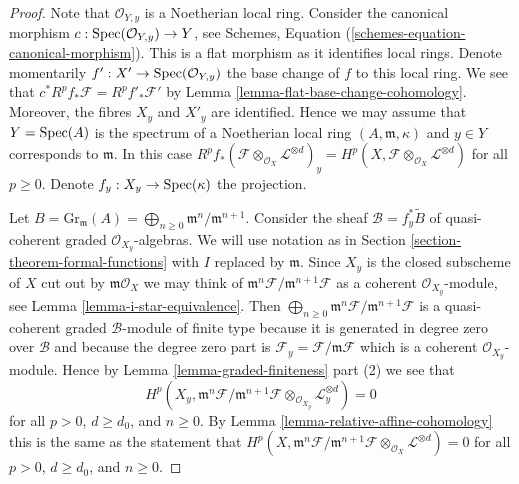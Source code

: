 \begin{proof}
Note that $\mathcal{O}_{Y, y}$ is a Noetherian local ring.
Consider the canonical morphism
$c : \mathop{\mathrm{Spec}}(\mathcal{O}_{Y, y}) \to Y$, see
Schemes, Equation (\ref{schemes-equation-canonical-morphism}).
This is a flat morphism as it identifies local rings.
Denote momentarily $f' : X' \to \mathop{\mathrm{Spec}}(\mathcal{O}_{Y, y})$
the base change of $f$ to this local ring. We see that
$c^*R^pf_*\mathcal{F} = R^pf'_*\mathcal{F}'$ by
Lemma \ref{lemma-flat-base-change-cohomology}.
Moreover, the fibres $X_y$ and $X'_y$ are identified.
Hence we may assume that $Y = \mathop{\mathrm{Spec}}(A)$ is the spectrum of
a Noetherian local ring $(A, \mathfrak m, \kappa)$ and $y \in Y$
corresponds to $\mathfrak m$. In this case
$R^pf_*(\mathcal{F} \otimes_{\mathcal{O}_X} \mathcal{L}^{\otimes d})_y =
H^p(X, \mathcal{F} \otimes_{\mathcal{O}_X} \mathcal{L}^{\otimes d})$
for all $p \geq 0$. Denote $f_y : X_y \to \mathop{\mathrm{Spec}}(\kappa)$ the projection.

\medskip\noindent
Let $B = \text{Gr}_\mathfrak m(A) =
\bigoplus_{n \geq 0} \mathfrak m^n/\mathfrak m^{n + 1}$.
Consider the sheaf $\mathcal{B} = f_y^*\widetilde{B}$
of quasi-coherent graded $\mathcal{O}_{X_y}$-algebras.
We will use notation as in Section \ref{section-theorem-formal-functions}
with $I$ replaced by $\mathfrak m$.
Since $X_y$ is the closed subscheme of $X$ cut out by
$\mathfrak m\mathcal{O}_X$ we may think of
$\mathfrak m^n\mathcal{F}/\mathfrak m^{n + 1}\mathcal{F}$
as a coherent $\mathcal{O}_{X_y}$-module, see
Lemma \ref{lemma-i-star-equivalence}. Then
$\bigoplus_{n \geq 0} \mathfrak m^n\mathcal{F}/\mathfrak m^{n + 1}\mathcal{F}$
is a quasi-coherent graded $\mathcal{B}$-module of finite type
because it is generated in degree zero over $\mathcal{B}$
and because the degree zero part is
$\mathcal{F}_y = \mathcal{F}/\mathfrak m \mathcal{F}$
which is a coherent $\mathcal{O}_{X_y}$-module.
Hence by Lemma \ref{lemma-graded-finiteness} part (2)
we see that
$$
H^p(X_y, \mathfrak m^n \mathcal{F}/ \mathfrak m^{n + 1}\mathcal{F}
\otimes_{\mathcal{O}_{X_y}} \mathcal{L}_y^{\otimes d}) = 0
$$
for all $p > 0$, $d \geq d_0$, and $n \geq 0$. By
Lemma \ref{lemma-relative-affine-cohomology}
this is the same as the statement that
$
H^p(X, \mathfrak m^n \mathcal{F}/ \mathfrak m^{n + 1}\mathcal{F}
\otimes_{\mathcal{O}_X} \mathcal{L}^{\otimes d}) = 0
$
for all $p > 0$, $d \geq d_0$, and $n \geq 0$.


\end{proof}
